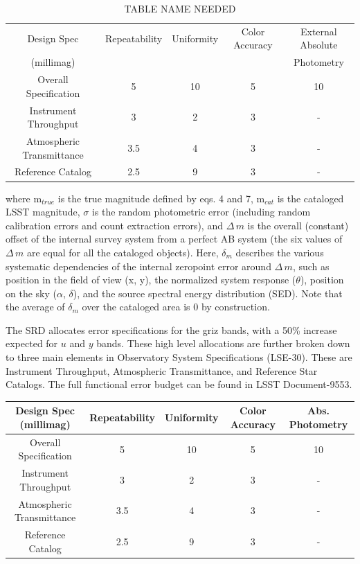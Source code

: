 \documentclass[SE,authoryear,lsstdraft,toc]{lsstdoc}
\newcommand{\deltam}{\delta_m}
\newcommand{\Deltam}{\Delta\,m}
\begin{document}
\begin{table}
\centering
\begin{tabular}{|c|c|c|c|c|}
\hline
Design Spec & Repeatability & Uniformity & Color Accuracy & External Absolute  \\
 (millimag) &  &  &  & Photometry \\
\hline\hline
Overall Specification & 5 &  10 & 5 & 10 \\
Instrument Throughput & 3 & 2 & 3 & -  \\
Atmospheric Transmittance & 3.5 & 4 & 3 & - \\
Reference Catalog & 2.5 & 9 & 3 & - \\
\hline
\end{tabular}
\caption{TABLE NAME NEEDED}
\label{tab:table1}
\end{table}
%
where $\textrm{m}_{true}$ is the true magnitude defined by eqs. 4 and 7,
$\textrm{m}_{cat}$ is the cataloged LSST magnitude, $\sigma$ is the random
photometric error (including random calibration errors and count extraction
errors), and $\Deltam$ is the overall (constant) offset of the internal survey
system from a perfect AB system (the six values of $\Deltam$ are equal for all
the cataloged objects).  Here, $\deltam$ describes the various systematic
dependencies of the internal zeropoint error around $\Deltam$, such as position
in the field of view (x, y), the normalized system response ($\theta$),
position on the sky ($\alpha$, $\delta$), and the source spectral energy
distribution (SED).  Note that the average of $\deltam$ over the cataloged area
is 0 by construction.

The SRD allocates error specifications for the griz bands, with a 50\% increase
expected for $u$ and $y$ bands.  These high level allocations are further broken
down to three main elements in Observatory System Specifications (LSE-30).
These are Instrument Throughput, Atmospheric Transmittance, and Reference Star
Catalogs.  The full functional error budget can be found in LSST Document-9553.

\begin{table}
    \begin{tabular}{|c|c|c|c|c|}
        \hline
        Design Spec (millimag) & Repeatability & Uniformity & Color Accuracy & Abs. Photometry \\
        \hline
        \hline
        Overall Specification & 5 & 10 & 5 & 10 \\
        \hline
        Instrument Throughput & 3 & 2 & 3 & - \\
        \hline
        Atmospheric Transmittance & 3.5 & 4 & 3 & - \\
        \hline
        Reference Catalog & 2.5 & 9 & 3 & - \\
        \hline
    \end{tabular}

\end{table}
\end{document}
